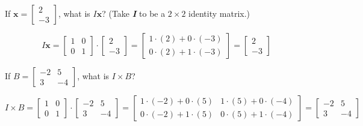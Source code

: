 \begin{Worked}
\begin{Problem}
If $\mathbf{x} = \begin{bmatrix}
2\\
-3
\end{bmatrix}$, what is $\mathbf{\mathit{I}}\mathbf{x}$? (Take \textbf{\textit{
I}} to be a $2 \times 2$ identity matrix.)
\end{Problem}
\begin{Solution}
$$\mathbf{\mathit{I}} \mathbf{x} = \begin{bmatrix}
1 & 0 \\
0 & 1
\end{bmatrix} \cdot \begin{bmatrix}
2 \\
-3
\end{bmatrix} = \begin{bmatrix}
1 \cdot (2) + 0 \cdot (-3)\\
0 \cdot (2) + 1 \cdot (-3)
\end{bmatrix} = \begin{bmatrix}
2\\
-3
\end{bmatrix}$$
\end{Solution}
\end{Worked}

\begin{Worked}
\begin{Problem}
If $\mathbf{\mathit{B}} = \begin{bmatrix}
-2 & 5\\
3 & -4
\end{bmatrix}$, what is $\mathbf{\mathit{I}} \times \mathbf{\mathit{B}}$?
\end{Problem}
\begin{Solution}
$$\mathbf{\mathit{I}} \times \mathbf{\mathit{B}} =
\begin{bmatrix}
1 & 0 \\
0 & 1
\end{bmatrix} \cdot \begin{bmatrix}
-2 & 5\\
3 & -4
\end{bmatrix} = \begin{bmatrix}
1 \cdot (-2) + 0 \cdot (5) & 1 \cdot (5) + 0 \cdot (-4)\\
0 \cdot (-2) + 1 \cdot (5) & 0 \cdot (5) + 1 \cdot (-4)
\end{bmatrix} = \begin{bmatrix}
-2 & 5\\
3 & -4
\end{bmatrix}$$
\end{Solution}
\end{Worked}

